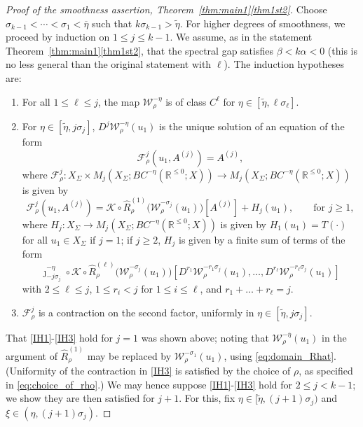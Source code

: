 \documentclass[a4paper, 12pt, oneside, reqno, notitlepage]{amsart}
\theoremstyle{plain}
\theoremstyle{definition}
\theoremstyle{remark}
\begin{document}
\begin{proof}[Proof of the smoothness assertion, Theorem~\ref{thm:main1}\ref{thm1st2}]
Choose $\sigma_{k-1} <\cdots<\sigma_1 < \overline\eta$ such that $k\sigma_{k-1} > \tilde{\eta}$.
For higher degrees of smoothness, we proceed by induction  on $1 \leq j \leq k-1$.
We assume, as in the statement Theorem~\ref{thm:main1}\ref{thm1st2}, that the spectral gap satisfies $\beta < k \alpha < 0$ (this is no less general than the original statement with $\ell$). 
The induction hypotheses are:
\begin{enumerate}[label =(IH.\arabic*)]
    \item \label{IH1} For all $1 \leq \ell \leq j$, the map $\mathcal{W}_\rho^{-{\eta}}$ is of class $C^\ell$ for $\eta \in [\tilde{\eta},\ell \sigma_\ell]$. 
    \item \label{IH2} For $\eta \in [\tilde{\eta},j \sigma_j]$, $D^j \mathcal{W}_\rho^{-{\eta}}(u_1)$ is the unique solution of an equation of the form
    \begin{displaymath}
        \mathcal{F}_\rho^j(u_1,A^{(j)} ) = A^{(j)} ,
    \end{displaymath}
    where $\mathcal{F}_\rho^j : X_\Sigma \times M_j(X_\Sigma; BC^{- \eta}(\mathbb{R}^{\leq 0};X)) \to M_j(X_\Sigma; BC^{-  \eta}(\mathbb{R}^{\leq 0};X))$ is given by
    \begin{displaymath}
        \mathcal{F}_\rho^j(u_1,A^{(j)} ) =  \mathcal{K} \circ \widehat{R}_\rho^{(1)} \big(\mathcal{W}_\rho^{-\sigma_j}(u_1) \big) [A^{(j)}] + H_j(u_1),  \qquad \text{for } j \geq 1,
    \end{displaymath}
    where $H_j : X_\Sigma \to M_j(X_\Sigma; BC^{-\eta}(\mathbb{R}^{\leq 0};X)) $ is given by  $H_1(u_1) = T(\cdot)$ for all $u_1 \in X_\Sigma$ if $j = 1$;
    if $j \geq 2$, $H_j$ is given by a finite sum of terms of the form
    \begin{equation}
        \jmath_{-j \sigma_j}^{-\eta} \circ\mathcal{K} \circ \widehat{R}_\rho^{(\ell)} \big(\mathcal{W}_\rho^{-\sigma_j}(u_1) \big) \left[  D^{r_1} \mathcal{W}_\rho^{-r_1{\sigma_j}}(u_1) ,\ldots,D^{r_\ell} \mathcal{W}_\rho^{-r_\ell{\sigma_j}}(u_1)  \right]
        \label{eq:Hj}
    \end{equation}
    with $2 \leq \ell \leq j$, $1 \leq r_i < j$ for $1 \leq i \leq \ell$, and $r_1 + \ldots + r_\ell =j$.
    \item \label{IH3} $\mathcal{F}_\rho^j$ is a contraction on the second factor, uniformly in $\eta \in [\tilde{\eta},j \sigma_j]$.
\end{enumerate} 


That \ref{IH1}-\ref{IH3} hold for $j = 1$ was shown above; noting that $\mathcal{W}_\rho^{-\overline{\eta}}(u_1) $ in the argument of $\widehat{R}_\rho^{(1)}$ may be replaced by $\mathcal{W}_\rho^{-\sigma_1}(u_1) $, using \eqref{eq:domain_Rhat}.
(Uniformity of the contraction in \ref{IH3} is satisfied by the choice of $\rho$, as specified in \eqref{eq:choice_of_rho}.)
We may hence suppose \ref{IH1}-\ref{IH3} hold for $2 \leq j < k-1$; we show they are then satisfied for $j+1$.
For this, fix $\eta \in [\tilde{\eta},(j+1) \sigma_j)$  and $\xi \in (\eta,(j+1)\sigma_j)$.



\end{proof}
\end{document}
